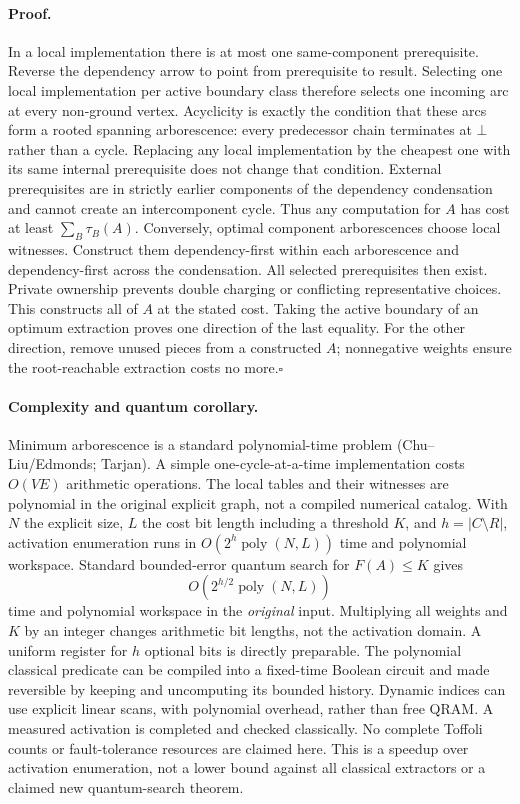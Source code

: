 \paragraph{Proof.}
In a local implementation there is at most one same-component prerequisite.
Reverse the dependency arrow to point from prerequisite to result. Selecting
one local implementation per active boundary class therefore selects one incoming
arc at every non-ground vertex. Acyclicity is exactly the condition that these
arcs form a rooted spanning arborescence: every predecessor chain terminates at
$\bot$ rather than a cycle. Replacing any local implementation by the cheapest
one with its same internal prerequisite does not change that condition. External
prerequisites are in strictly earlier components of the dependency condensation
and cannot create an intercomponent cycle. Thus any computation for $A$ has
cost at least $\sum_B\tau_B(A)$. Conversely, optimal component arborescences
choose local witnesses. Construct them dependency-first within each arborescence
and dependency-first across the condensation. All selected prerequisites then
exist. Private ownership prevents double charging or conflicting representative
choices. This constructs all of $A$ at the stated cost. Taking the active boundary
of an optimum extraction proves one direction of the last equality. For the
other direction, remove unused pieces from a constructed $A$; nonnegative weights
ensure the root-reachable extraction costs no more.\hfill$\square$

\paragraph{Complexity and quantum corollary.}
Minimum arborescence is a standard polynomial-time problem (Chu--Liu/Edmonds;
Tarjan). A simple one-cycle-at-a-time implementation costs $O(VE)$ arithmetic
operations. The local tables and their witnesses are polynomial in the original
explicit graph, not a compiled numerical catalog. With $N$ the explicit size,
$L$ the cost bit length including a threshold $K$, and $h=|C\setminus R|$,
activation enumeration runs in $O(2^h\operatorname{poly}(N,L))$ time and
polynomial workspace. Standard bounded-error quantum search for $F(A)\leq K$
gives
\[
 O(2^{h/2}\operatorname{poly}(N,L))
\]
time and polynomial workspace in the \emph{original} input. Multiplying all
weights and $K$ by an integer changes arithmetic bit lengths, not the activation
domain. A uniform register for $h$ optional bits is directly preparable. The
polynomial classical predicate can be compiled into a fixed-time Boolean circuit
and made reversible by keeping and uncomputing its bounded history. Dynamic
indices can use explicit linear scans, with polynomial overhead, rather than
free QRAM. A measured activation is completed and checked classically. No
complete Toffoli counts or fault-tolerance resources are claimed here. This is
a speedup over activation enumeration, not a lower bound against all classical
extractors or a claimed new quantum-search theorem.

